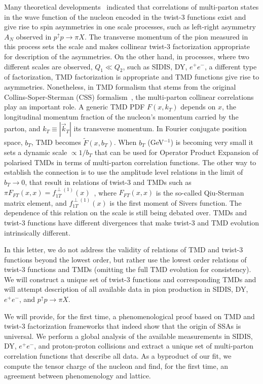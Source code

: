 \documentclass[twocolumn,prl,aps,superscriptaddress
               ,footinbib,amsfonts,amsmath,amssymb,showpacs]{revtex4-1}
\newcommand{\new}[1]{{\color{blue}#1}}
\begin{document}
%
\new{Many theoretical developments~\cite{Efremov:1981sh, Efremov:1984ip, Qiu:1991pp, Qiu:1998ia,
Kouvaris:2006zy, Eguchi:2006mc, Koike:2009ge, Metz:2012ct,
Kanazawa:2013uia, Beppu:2013uda}
indicated that correlations of multi-parton states in the wave function of the nucleon encoded in the twist-3 functions 
 exist and give rise to spin asymmetries in one scale processes, such as left-right asymmetry $A_N$ observed in $p^\uparrow p \to \pi X$. 
The transverse momentum of the pion  measured in this process sets the scale and makes collinear twist-3 factorization appropriate for description of the asymmetries. On the other hand, in processes, where two different scales are observed, $Q_1 \ll Q_2$, such as SIDIS, DY, $e^+e^-$, a different type of factorization, TMD factorization is 
 appropriate and TMD functions give rise to asymmetries. Nonetheless, in TMD formalism that stems from the original  Collins-Soper-Sterman (CSS)
formalism~\cite{Collins:2011zzd}, the multi-parton collinear correlations play an important role. A generic TMD PDF $F(x,k_T)$ depends on $x$, the longitudinal
momentum fraction of the nucleon's momentum carried by the parton, and $k_T\equiv |\vec{k}_T|$ its
transverse momentum. In Fourier conjugate position space, $b_T$, TMD becomes $\tilde F(x,b_T)$. When $b_T$ (GeV$^{-1}$) is becoming very small it sets a dynamic scale $\propto 1/b_T$ that can be used for Operator Product Expansion of polarised TMDs in terms of multi-parton correlation functions. The other way to establish the  connection is to use the amplitude level relations in the limit of $b_T\to 0$, that result in relations of twist-3 and TMDs such as $\pi F_{FT}(x,x)=f_{1T}^{\perp(1)}(x)$~\cite{Boer:2003cm}, where $F_{FT}(x,x)$ is the so-called Qiu-Sterman matrix element, and $f_{1T}^{\perp(1)}(x)$ is the first moment of Sivers function. The dependence of this relation on the scale is still being debated over. TMDs and twist-3 functions have different divergences that make twist-3 and TMD evolution intrinsically different.

In this letter, we do not address the validity of relations of TMD and twist-3 functions beyond the lowest order, but rather use the lowest order relations of twist-3 functions and TMDs (omitting the full TMD evolution for consistency). We will construct a unique set of twist-3 functions and corresponding TMDs and will attempt description of all available data in pion production in SIDIS, DY, $e^+e^-$, and $p^\uparrow p \to \pi X$. 
}
%
We will provide, for the first time, a phenomenological
proof based on TMD and twist-3 factorization frameworks that indeed
show that 
the origin of SSAs is universal. We perform a global analysis of the
available measurements in SIDIS, DY, $e^+e^-$, and proton-proton
collisions and extract a unique set of multi-parton correlation
functions that describe all data. As a byproduct of our fit, we
compute the tensor charge of the nucleon and find, for the first time,
an agreement between phenomenology and lattice.
\end{document}
